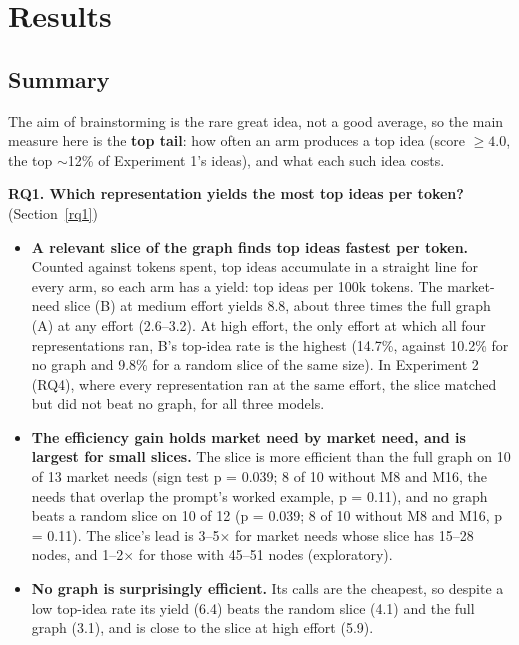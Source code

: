 \hypertarget{results}{%
\section{Results}\label{results}}

\hypertarget{summary}{%
\subsection{Summary}\label{summary}}

The aim of brainstorming is the rare great idea, not a good average, so the main measure here is the \textbf{top tail}: how often an arm produces a top idea (score $\ge 4.0$, the top $\sim$12\% of Experiment 1's ideas), and what each such idea costs.

\textbf{RQ1. Which representation yields the most top ideas per token?} (Section~\ref{rq1})

\begin{itemize}
\tightlist
\item
  \textbf{A relevant slice of the graph finds top ideas fastest per token.} Counted against tokens spent, top ideas accumulate in a straight line for every arm, so each arm has a yield: top ideas per 100k tokens. The market-need slice (B) at medium effort yields 8.8, about three times the full graph (A) at any effort (2.6--3.2). At high effort, the only effort at which all four representations ran, B's top-idea rate is the highest (14.7\%, against 10.2\% for no graph and 9.8\% for a random slice of the same size). In Experiment 2 (RQ4), where every representation ran at the same effort, the slice matched but did not beat no graph, for all three models.
\item
  \textbf{The efficiency gain holds market need by market need, and is largest for small slices.} The slice is more efficient than the full graph on 10 of 13 market needs (sign test p = 0.039; 8 of 10 without M8 and M16, the needs that overlap the prompt's worked example, p = 0.11), and no graph beats a random slice on 10 of 12 (p = 0.039; 8 of 10 without M8 and M16, p = 0.11). The slice's lead is 3--5$\times$ for market needs whose slice has 15--28 nodes, and 1--2$\times$ for those with 45--51 nodes (exploratory).
\item
  \textbf{No graph is surprisingly efficient.} Its calls are the cheapest, so despite a low top-idea rate its yield (6.4) beats the random slice (4.1) and the full graph (3.1), and is close to the slice at high effort (5.9).
\end{itemize}

